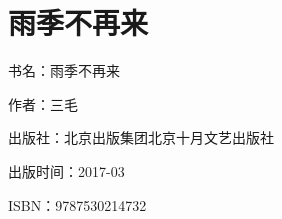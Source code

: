 


\section{雨季不再来}


\par 书名：雨季不再来
\par 作者：三毛
\par 出版社：北京出版集团北京十月文艺出版社
\par 出版时间：2017-03
\par ISBN：9787530214732









\subsection{}







\subsection{}







\subsection{}







\subsection{}







\subsection{}







\subsection{}







